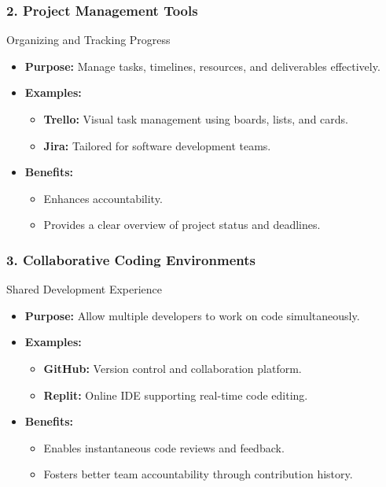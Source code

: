 \documentclass[aspectratio=169]{beamer}
\begin{document}
\begin{frame}[fragile]
    \frametitle{2. Project Management Tools}
    \begin{block}{Organizing and Tracking Progress}
    \begin{itemize}
        \item \textbf{Purpose:} Manage tasks, timelines, resources, and deliverables effectively.
        \item \textbf{Examples:}
            \begin{itemize}
                \item \textbf{Trello:} Visual task management using boards, lists, and cards.
                \item \textbf{Jira:} Tailored for software development teams.
            \end{itemize}
        \item \textbf{Benefits:}
            \begin{itemize}
                \item Enhances accountability.
                \item Provides a clear overview of project status and deadlines.
            \end{itemize}
    \end{itemize}
    \end{block}
\end{frame}

\begin{frame}[fragile]
    \frametitle{3. Collaborative Coding Environments}
    \begin{block}{Shared Development Experience}
    \begin{itemize}
        \item \textbf{Purpose:} Allow multiple developers to work on code simultaneously.
        \item \textbf{Examples:}
            \begin{itemize}
                \item \textbf{GitHub:} Version control and collaboration platform.
                \item \textbf{Replit:} Online IDE supporting real-time code editing.
            \end{itemize}
        \item \textbf{Benefits:}
            \begin{itemize}
                \item Enables instantaneous code reviews and feedback.
                \item Fosters better team accountability through contribution history.
            \end{itemize}
    \end{itemize}
    \end{block}
\end{frame}
\end{document}

